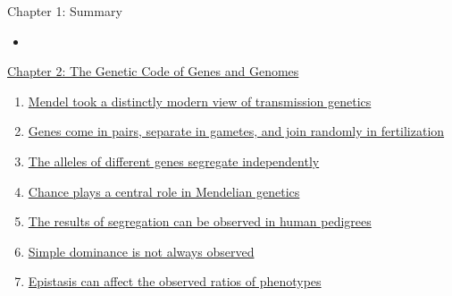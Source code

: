 \documentclass[12pt,letterpaper]{article}
\newcommand{\thetitle}{\hypertarget{home}{Essential Genetics and Genomics}}
\begin{document}
\begin{probbox}{Chapter 1: Summary}{
    \begin{itemize}
        \item
    \end{itemize}
}\end{probbox}



\clearpage

\renewcommand{\thetitle}{\hypertarget{2}{The Genetic Code of Genes
and Genomes}}
\hypertarget{2}{} 

\begin{chapbox}{\hyperlink{home}{Chapter 2: The Genetic Code of Genes
    and Genomes}}
    \begin{enumerate}
        \item \hyperlink{2.1}{Mendel took a distinctly modern view of transmission genetics}
        \item \hyperlink{2.2}{Genes come in pairs, separate in gametes, and join randomly in fertilization}
        \item \hyperlink{2.3}{The alleles of different genes segregate independently}
        \item \hyperlink{2.4}{Chance plays a central role in Mendelian genetics}
        \item \hyperlink{2.5}{The results of segregation can be observed in human pedigrees}
        \item \hyperlink{2.6}{Simple dominance is not always observed}
        \item \hyperlink{2.7}{Epistasis can affect the observed ratios of phenotypes}
    \end{enumerate}
\end{chapbox}
\end{document}
